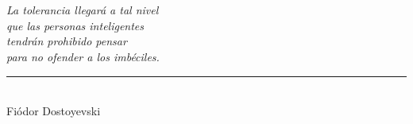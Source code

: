 \chapter*{} %

\begin{flushright}
    \textit{La tolerancia llegará a tal nivel \\ que las personas inteligentes \\ tendrán prohibido pensar \\ para no ofender a los imbéciles. 
    } \\
    \rule{5cm}{0.5pt} 
    \\ Fiódor Dostoyevski
\end{flushright}

